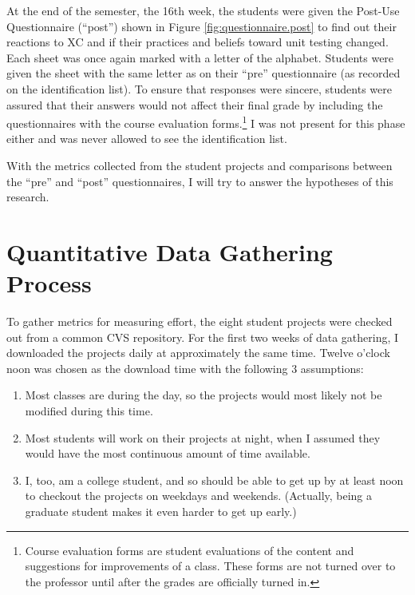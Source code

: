 At the end of the semester, the 16th week, the students were given the
Post-Use Questionnaire (``post'') shown in Figure
\ref{fig:questionnaire.post} to find out their reactions to XC and if their
practices and beliefs toward unit testing changed.  Each sheet was once
again marked with a letter of the alphabet.  Students were given the sheet
with the same letter as on their ``pre'' questionnaire (as recorded on the
identification list).  To ensure that responses were sincere, students were
assured that their answers would not affect their final grade by including
the questionnaires with the course evaluation forms.\footnote{Course
evaluation forms are student evaluations of the content and suggestions for
improvements of a class.  These forms are not turned over to the professor
until after the grades are officially turned in.}  I was not present for
this phase either and was never allowed to see the identification list.

With the metrics collected from the student projects and comparisons
between the ``pre'' and ``post'' questionnaires, I will try to answer the
hypotheses of this research.

\section{Quantitative Data Gathering Process}
To gather metrics for measuring effort, the eight student projects were
checked out from a common CVS repository.  For the first two weeks of data
gathering, I downloaded the projects daily at approximately the same time.
Twelve o'clock noon was chosen as the download time with the following 3
assumptions:

\begin{enumerate}
\item Most classes are during the day, so the projects would most likely
      not be modified during this time.
\item Most students will work on their projects at night, when I assumed
      they would have the most continuous amount of time available.
\item I, too, am a college student, and so should be able to get up by at
      least noon to checkout the projects on weekdays and weekends.
      (Actually, being a graduate student makes it even harder to get up
      early.)
\end{enumerate}

